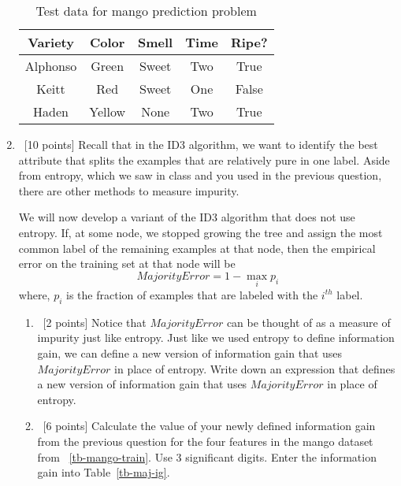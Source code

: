 \begin{enumerate}
\begin{enumerate}
  \end{enumerate}

  \begin{table}[h!]
    \centering
    \begin{tabular}{cccc|c}
      \hline
      Variety & Color  & Smell  & Time & Ripe?  \\ \hline
      Alphonso& Green  & Sweet  & Two  & True   \\
      Keitt   & Red    & Sweet  & One  & False  \\
      Haden   & Yellow & None   & Two  & True   \\ \hline
    \end{tabular}
    \caption{Test data for mango prediction problem}\label{tb-mango-test}
  \end{table}

\item~[10 points] Recall that in the ID3 algorithm, we want to identify the best attribute that splits the examples that are relatively pure in one label.
  Aside from entropy, which we saw in class and you used in the previous question, there are other methods to measure impurity.

  We will now develop a variant of the ID3 algorithm that does not use entropy. If, at some node, we stopped growing the tree and assign the most common label of the remaining examples at that node, then the empirical error on the training set at that node will be
  $$MajorityError = 1 - \max_{i}p_i$$
  where, $p_i$ is the fraction of examples that are labeled with the $i^{th}$ label.





  \begin{enumerate}
  \item~[2 points]   Notice that $MajorityError$ can be thought of as a measure of impurity just like entropy. Just like we used entropy to define information gain, we can define a new version of information gain that uses $MajorityError$ in place of entropy. Write down an expression that defines a new version of information gain that uses $MajorityError$ in place of entropy.

  \item~[6 points] Calculate the value of your newly defined information gain from the previous question for the four features in the mango dataset from ~\ref{tb-mango-train}. Use 3 significant digits. Enter the information gain into Table~\ref{tb-maj-ig}.


\end{enumerate}
\end{enumerate}
